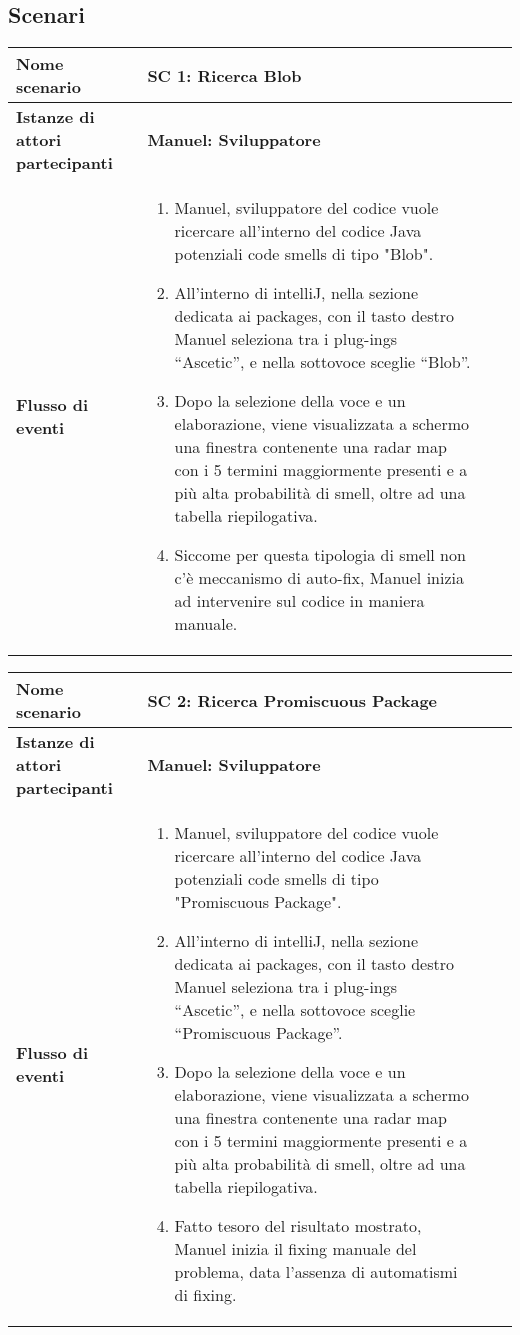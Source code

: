 
	
	\subsection{Scenari}
	\begin{tabular}{|l|p{8cm}|p{1cm}|p{1.1cm}}
		\hline
		\textbf{Nome scenario}  & \textbf{SC 1: Ricerca Blob} \\ \hline
		\textbf{Istanze di attori partecipanti}  & \textbf{Manuel: Sviluppatore} \\ \hline
		\textbf{Flusso di eventi} & \begin{enumerate}
			\item Manuel, sviluppatore del codice vuole ricercare all’interno del codice Java potenziali code smells di tipo "Blob".
			\item All’interno di intelliJ, nella sezione dedicata ai packages, con il tasto destro Manuel seleziona tra i plug-ings “Ascetic”, e nella sottovoce sceglie “Blob”.
			\item Dopo la selezione della voce e un elaborazione, viene visualizzata a schermo una finestra contenente una radar map con i 5 termini maggiormente presenti e a più alta probabilità di smell, oltre ad una tabella riepilogativa.
			\item Siccome per questa tipologia di smell non c'è meccanismo di auto-fix, Manuel inizia ad intervenire sul codice in maniera manuale.
		\end{enumerate}\\ \hline
	\end{tabular}

	\vspace{1cm}
		
		
	\noindent\begin{tabular}{|l|p{8cm}|p{1cm}|p{1.1cm}|}
		\hline
		\textbf{Nome scenario}  & \textbf{SC 2: Ricerca Promiscuous Package} \\ \hline
		\textbf{Istanze di attori partecipanti}  & \textbf{Manuel: Sviluppatore} \\ \hline
		\textbf{Flusso di eventi}  & \begin{enumerate}
	 \item Manuel, sviluppatore del codice vuole ricercare all’interno del codice Java potenziali code smells di tipo "Promiscuous Package".
	 \item  All’interno di intelliJ, nella sezione dedicata ai packages, con il tasto destro Manuel seleziona tra i plug-ings “Ascetic”, e nella sottovoce sceglie “Promiscuous Package”. 
		\item Dopo la selezione della voce e un elaborazione, viene visualizzata a schermo una finestra contenente una radar map con i 5 termini maggiormente presenti e a più alta probabilità di smell, oltre ad una tabella riepilogativa.
		\item Fatto tesoro del risultato mostrato, Manuel inizia il fixing manuale del problema, data l'assenza di automatismi di fixing.
		\end{enumerate} \\ \hline
	\end{tabular}

